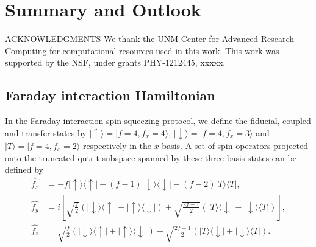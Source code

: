 \documentclass[preprint,aps,pra,onecolumn,superscriptaddress]{revtex4-1} %
\def\bra#1{\langle{#1}\rvert}%
\def\ket#1{\lvert{#1}\rangle}%
\begin{document}
\section{Summary and Outlook} \label{Sec::Conclusion}


ACKNOWLEDGMENTS
We thank the UNM Center for Advanced Research Computing for computational resources used in this work.
This work was supported by the NSF, under grants PHY-1212445, xxxxx.




\begin{appendix}

\section{Faraday interaction Hamiltonian} \label{Appendix::FaradayInteractionHamiltonian}
In the Faraday interaction spin squeezing protocol, we define the fiducial, coupled and transfer states by $ \ket{\uparrow}=\ket{f=4,f_x=4} $, $ \ket{\downarrow}=\ket{f=4,f_x=3} $ and $ \ket{T}=\ket{f=4,f_x=2} $ respectively in the $ x $-basis. 
A set of spin operators projected onto the truncated qutrit subspace spanned by these three basis states can be defined by
\begin{align}
\hat{f_x} &= -f \ket{\uparrow}\bra{\uparrow} -(f-1)\ket{\downarrow}\bra{\downarrow}-(f-2)\ket{T}\bra{T},\\
\hat{f_y} &=i\left[\sqrt{\frac{f}{2}}\left(\ket{\downarrow}\bra{\uparrow}-\ket{\uparrow}\bra{\downarrow}\right) +\sqrt{\frac{2f-1}{2}}\left(\ket{T}\bra{\downarrow}-\ket{\downarrow}\bra{T} \right) \right] ,\\
\hat{f_z} &= \sqrt{\frac{f}{2}}\left(\ket{\downarrow}\bra{\uparrow}+\ket{\uparrow}\bra{\downarrow}\right) +\sqrt{\frac{2f-1}{2}}\left(\ket{T}\bra{\downarrow}+\ket{\downarrow}\bra{T} \right).
\end{align}


\end{appendix}
\end{document}
